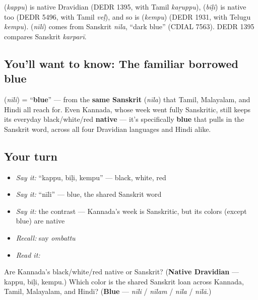 \begin{cousinweb}
\textbf{} (\emph{kappu}) is native Dravidian (DEDR 1395, with Tamil \emph{kaṟuppu}), \textbf{} (\emph{biḷi}) is native too (DEDR 5496, with Tamil \emph{veḷ}), and so is \textbf{} (\emph{kempu}) (DEDR 1931, with Telugu \emph{kempu}). \textbf{} (\emph{nīli}) comes from Sanskrit \emph{nīla}, \textquotedblleft{}dark blue\textquotedblright{} (CDIAL 7563). DEDR 1395 compares Sanskrit \emph{karparī}.
\end{cousinweb}

\subsection*{You'll want to know: The familiar borrowed blue}
\textbf{} (\emph{nīli}) = \textquotedblleft{}\textbf{blue}\textquotedblright{} — from the \textbf{same Sanskrit}  (\emph{nīla}) that Tamil, Malayalam, and Hindi all reach for. Even Kannada, whose week went fully Sanskritic, still keeps its everyday black/white/red \textbf{native} — it's specifically \textbf{blue} that pulls in the Sanskrit word, across all four Dravidian languages and Hindi alike.

\subsection*{Your turn}
\begin{itemize}
\raggedright
  \item \emph{Say it:} \textquotedblleft{}kappu, biḷi, kempu\textquotedblright{} — black, white, red
  \item \emph{Say it:} \textquotedblleft{}nīli\textquotedblright{} — blue, the shared Sanskrit word
  \item \emph{Say it:} the contrast — Kannada's week is Sanskritic, but its colors (except blue) are native
  \item \emph{Recall:} say \emph{ombattu}
  \item \emph{Read it:} \textbf{}
\end{itemize}

\begin{tcolorbox}[breakable,colback=teal!4,colframe=teal!35!black,title={Before you move on}]
Are Kannada's black/white/red native or Sanskrit? (\textbf{Native Dravidian} — kappu, biḷi, kempu.) Which color is the shared Sanskrit loan across Kannada, Tamil, Malayalam, and Hindi? (\textbf{Blue} —  \emph{nīli} /  \emph{nīlam} /  \emph{nīla} /  \emph{nīlā}.)
\end{tcolorbox}
